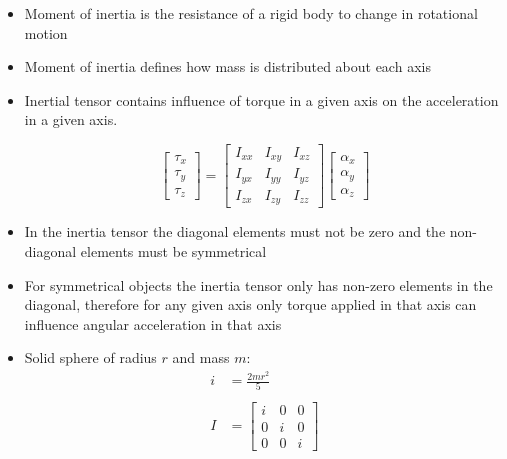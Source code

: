 \documentclass[a4paper]{article}
\begin{document}
\begin{itemize}
  \item
    Moment of inertia is the resistance of a rigid body to change in rotational
    motion

  \item
    Moment of inertia defines how mass is distributed about each axis

  \item
    Inertial tensor contains influence of torque in a given axis on the
    acceleration in a given axis.

    \[
      \left [
        \begin{array}{c}
          \tau_{x} \\
          \tau_{y} \\
          \tau_{z}
        \end{array}
      \right ]
      =
      \left [
        \begin{array}{ccc}
          I_{xx} & I_{xy} & I_{xz} \\
          I_{yx} & I_{yy} & I_{yz} \\
          I_{zx} & I_{zy} & I_{zz}
        \end{array}
      \right ]
      \left [
        \begin{array}{c}
          \alpha_{x} \\
          \alpha_{y} \\
          \alpha_{z}
        \end{array}
      \right]
    \]

  \item
    In the inertia tensor the diagonal elements must not be zero and the
    non-diagonal elements must be symmetrical

  \item
    For symmetrical objects the inertia tensor only has non-zero elements in the
    diagonal, therefore for any given axis only torque applied in that axis can
    influence angular acceleration in that axis

  \item
    Solid sphere of radius $r$ and mass $m$:
    \begin{align*}
      i &= \frac{2mr^{2}}{5} \\
      \\
      I &= \left [
        \begin{array}{ccc}
          i & 0 & 0 \\
          0 & i & 0 \\
          0 & 0 & i
        \end{array}
      \right ]
    \end{align*}


\end{itemize}
\end{document}
